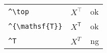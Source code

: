 \documentclass[preview]{standalone}
\newcommand{\tA}[1]{\textcolor{cA}{#1}}
\newcommand{\tD}[1]{\textcolor{cD}{#1}}
\begin{document}
\begin{table}[H]
    \centering
    \begin{tabular}{lll}
        \verb|^\top|         & $X^\top$         & \tA{ok} \\
        \verb|^{\mathsf{T}}| & $X^{\mathsf{T}}$ & \tA{ok} \\
        \verb|^T|            & $X^T$            & \tD{ng}
    \end{tabular}
\end{table}
\end{document}

